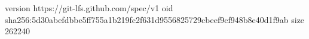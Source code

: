 version https://git-lfs.github.com/spec/v1
oid sha256:5d30abefdbbe5ff755a1b219fc2f631d9556825729cbeef9cf948b8e40d1f9ab
size 262240
